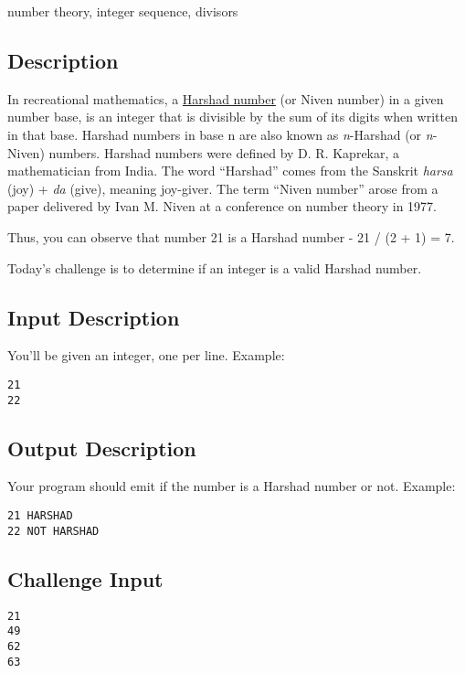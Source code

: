 number theory, integer sequence, divisors

\subsection{Description}\label{description-27}

In recreational mathematics, a
\href{https://en.wikipedia.org/wiki/Harshad_number}{Harshad number} (or
Niven number) in a given number base, is an integer that is divisible by
the sum of its digits when written in that base. Harshad numbers in base
n are also known as \emph{n}-Harshad (or \emph{n}-Niven) numbers.
Harshad numbers were defined by D. R. Kaprekar, a mathematician from
India. The word ``Harshad'' comes from the Sanskrit \emph{harsa} (joy) +
\emph{da} (give), meaning joy-giver. The term ``Niven number'' arose
from a paper delivered by Ivan M. Niven at a conference on number theory
in 1977.

Thus, you can observe that number 21 is a Harshad number - 21 / (2 + 1)
= 7.

Today's challenge is to determine if an integer is a valid Harshad
number.

\subsection{Input Description}\label{input-description-19}

You'll be given an integer, one per line. Example:

\begin{verbatim}
21
22
\end{verbatim}

\subsection{Output Description}\label{output-description-20}

Your program should emit if the number is a Harshad number or not.
Example:

\begin{verbatim}
21 HARSHAD
22 NOT HARSHAD
\end{verbatim}

\subsection{Challenge Input}\label{challenge-input-21}

\begin{verbatim}
21
49
62
63
\end{verbatim}

